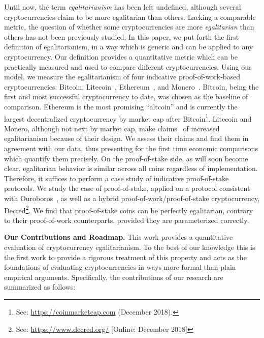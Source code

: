 Until now, the term \emph{egalitarianism} has been left undefined, although
several cryptocurrencies claim to be more egalitarian than others.
Lacking a comparable metric, the question of whether some cryptocurrencies are
more \emph{egalitarian} than others has not been previously studied. In this paper, we
put forth the first definition of egalitarianism, in a way which is
generic and can be applied to any cryptocurrency.
Our definition provides a quantitative metric which can be practically measured and used
to compare different cryptocurrencies.
Using our model, we measure the egalitarianism of
four indicative proof-of-work-based
cryptocurrencies: Bitcoin, Litecoin~\cite{lee2011litecoin}, Ethereum~\cite{wood2014ethereum}, and Monero~\cite{van2013cryptonote}. Bitcoin, being the first and most successful cryptocurrency to date, was chosen as
the baseline of comparison. Ethereum is the most promising ``altcoin'' and is currently the largest decentralized cryptocurrency by market cap after Bitcoin\footnote{See: \url{https://coinmarketcap.com} (December 2018).}.
Litecoin and Monero, although not next by market cap,
make claims~\cite{van2013cryptonote,mcmillan2013} of increased egalitarianism because of their design.
We assess their claims and find them in agreement with our data, thus presenting for the first time economic comparisons which quantify them precisely.
On the proof-of-stake side, as will soon become clear, egalitarian
behavior is similar across all coins regardless of implementation. Therefore,
it suffices to perform a case study of indicative proof-of-stake protocols.
We study the case of proof-of-stake, applied on a protocol consistent with Ouroboros~\cite{C:KRDO17},
as well as a hybrid proof-of-work/proof-of-stake cryptocurrency,
Decred\footnote{See: \url{https://www.decred.org/} [Online: December 2018]}. We find that proof-of-stake coins can be perfectly
egalitarian, contrary to their proof-of-work counterparts, provided they are parameterized correctly.

\noindent
\textbf{Our Contributions and Roadmap.}
This work provides a quantitative evaluation of cryptocurrency egalitarianism.
To the best of our knowledge this is the first work to provide a rigorous
treatment of this property and acts as the foundations of evaluating
cryptocurrencies in ways more formal than plain empirical arguments.
Specifically, the contributions of our research are summarized as follows:

